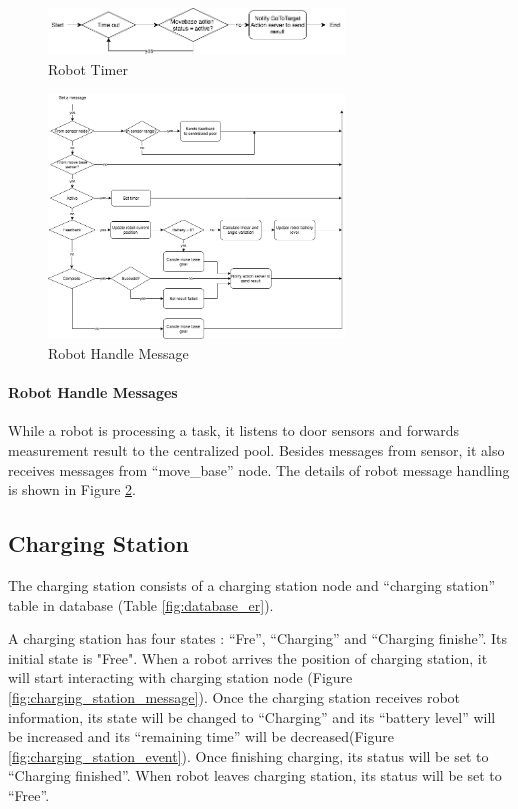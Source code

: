 \begin{figure}[htbp]
    \centering
    \includegraphics[width = 0.7\textwidth]{content/images/ch4/robot_timer.drawio.png}
    \caption{Robot Timer}
    \label{fig:robot_timer}
\end{figure}

\begin{figure}[htbp]
    \centering
    \includegraphics[width = 0.7\textwidth]{content/images/ch4/robot_message.drawio.png}
    \caption{Robot Handle Message}
    \label{fig:robot_handle_message}
\end{figure}

\paragraph{Robot Handle Messages}
While a robot is processing a task, it listens to door sensors and forwards measurement result to the centralized pool. 
Besides messages from sensor, it also receives messages from ``move\_base'' node. The details of robot message handling is shown in Figure \ref{fig:robot_handle_message}.

\subsection{Charging Station}
\label{sec:charging_station}
The charging station consists of a charging station node and ``charging station'' table in database (Table \ref{fig:database_er}). 

A charging station has four states : ``Fre'', ``Charging'' and ``Charging finishe''. Its initial state is "Free". When a robot arrives the position of charging station, it will start interacting with charging station node (Figure \ref{fig:charging_station_message}). 
Once the charging station receives robot information, its state will be changed to ``Charging'' and its ``battery level'' will be increased and its ``remaining time'' will be decreased(Figure \ref{fig:charging_station_event}).  
Once finishing charging, its status will be set to ``Charging finished''. When robot leaves charging station, its status will be set to ``Free''. 

